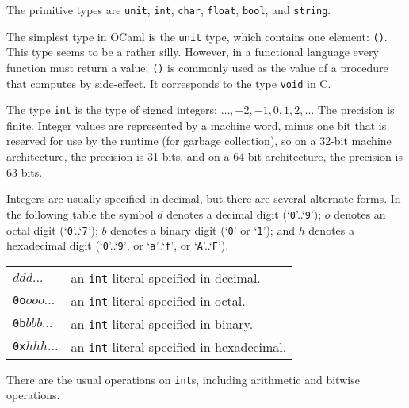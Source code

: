 The primitive types are \hbox{\lstinline/unit/}, \hbox{\lstinline/int/}, \hbox{\lstinline/char/}, \hbox{\lstinline/float/},
\hbox{\lstinline/bool/}, and \hbox{\lstinline/string/}.


The simplest type in OCaml is the \texttt{unit} type, which contains one
element: \hbox{\lstinline/()/}.  This type seems to be a rather silly.  However,
in a functional language every function must return a value; \hbox{\lstinline/()/} is
commonly used as the value of a procedure that computes by
side-effect.  It corresponds to the type \hbox{\lstinline/void/} in C.


The type \hbox{\lstinline/int/} is the type of signed integers:
$\ldots, -2, -1, 0, 1, 2, \ldots$ The precision is finite.  Integer
values are represented by a machine word, minus one bit that is
reserved for use by the runtime (for garbage collection), so on a 32-bit machine
architecture, the precision is 31 bits, and on a 64-bit architecture,
the precision is 63 bits.

\label{literal:integer}
Integers are usually specified in decimal, but there are several
alternate forms.  In the following table the symbol $d$ denotes a
decimal digit (`\hbox{\lstinline/0/}'..`\hbox{\lstinline/9/}'); $o$ denotes an octal digit
(`\hbox{\lstinline/0/}'..`\hbox{\lstinline/7/}'); $b$ denotes a binary digit (`\hbox{\lstinline/0/}' or
`\hbox{\lstinline/1/}'); and $h$ denotes a hexadecimal digit
(`\hbox{\lstinline/0/}'..`\hbox{\lstinline/9/}', or `\hbox{\lstinline/a/}'..`\hbox{\lstinline/f/}', or
`\hbox{\lstinline/A/}'..`\hbox{\lstinline/F/}').

\begin{center}
\begin{tabular}{ll}
{$ddd\ldots$} & {an \hbox{\lstinline/int/} literal specified in decimal.}\\
{\hbox{\lstinline/0o/}$ooo\ldots$} & {an \hbox{\lstinline/int/} literal specified in octal.}\\
{\hbox{\lstinline/0b/}$bbb\ldots$} & {an \hbox{\lstinline/int/} literal specified in binary.}\\
{\hbox{\lstinline/0x/}$hhh\ldots$} & {an \hbox{\lstinline/int/} literal specified in hexadecimal.}
\end{tabular}
\end{center}
%
There are the usual operations on \hbox{\lstinline/int/}s, including arithmetic
and bitwise operations.


